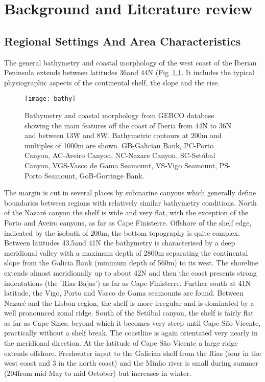 \chapter{Background and Literature review}%
\label{ch:litrev}
\section{Regional Settings And Area Characteristics}

The general  bathymetry and coastal morphology of the west coast
of the Iberian Peninsula extends between latitudes 36\deg and
44\deg N (Fig~\ref{fig:largebathy}. It includes the typical
physiographic aspects of the continental shelf, the slope and the
rise.
\begin{figure}
 \begin{minipage}[b]{.35\textwidth}
 \texttt{[image: bathy]}
\end{minipage}
 \begin{minipage}[b]{.5\textwidth}
 \caption[Bathymetry of the Region]
 {Bathymetry and coastal morphology from GEBCO
 database showing the main features off the coast of
 Iberia from 44\deg N to 36\deg N and between 13\deg W and 8\deg W.
 Bathymetric contours at 200m and multiples of 1000m are shown.
 GB-Galician Bank, PC-Porto Canyon, AC-Aveiro Canyon, NC-Nazare
 Canyon, SC-Set\'{u}bal Canyon, VGS-Vasco de Gama Seamount,
 VS-Vigo Seamount, PS-Porto Seamount, GoB-Gorringe Bank.}
 \label{fig:largebathy}
 \end{minipage}
 \end{figure}
 The margin is cut in several places by submarine canyons which
generally define boundaries between regions with relatively
similar bathymetry conditions. North of the Nazar\'{e} canyon the
shelf is wide and very flat, with the exception of the Porto and
Aveiro canyons, as far as Cape Finisterre. Offshore of the shelf
edge, indicated by the isobath of 200m, the bottom topography is
quite complex. Between latitudes 43.5\deg and 41\deg N the
bathymetry is characterised by a deep meridional valley with a
maximum depth of 2800m separating the continental slope from the
Galicia Bank (minimum depth of 560m) to its west. The shoreline
extends almost meridionally up to about 42\deg N and then the
coast presents strong indentations (the 'Rias Bajas') as far as
Cape Finisterre. Further south at 41\deg N latitude, the Vigo,
Porto and Vasco de Gama seamounts are found. Between Nazar\'{e}
and the Lisbon region, the shelf is more irregular and is
dominated by a well pronounced zonal ridge. South of the
Set\'{u}bal canyon, the shelf is fairly flat as far as Cape Sines,
beyond which it becomes very steep until Cape S\~{a}o Vicente,
practically without a shelf break. The coastline is again
orientated very nearly in the meridional direction. At the
latitude of Cape S\~{a}o Vicente a large ridge extends offshore.
Freshwater input to the Galician shelf from the Rias (four in the
west coast and 3 in the north coast) and the Minho river is small
during summer (204\tra from mid May to mid October)
\citep{Huthnance02} but increases in winter.


